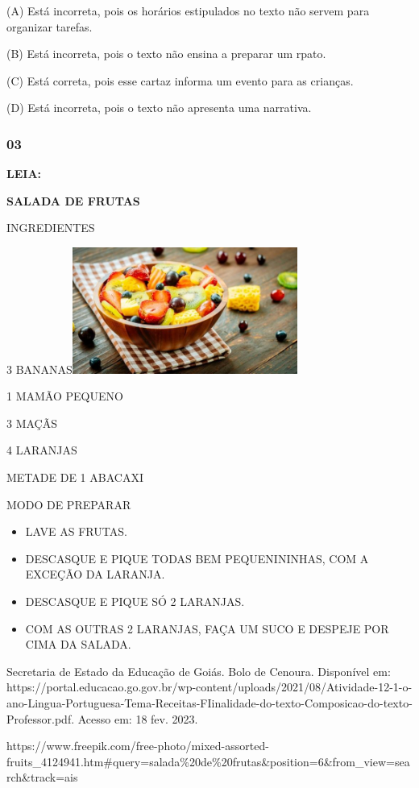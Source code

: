 (A) Está incorreta, pois os horários estipulados no texto não servem para organizar tarefas.

(B) Está incorreta, pois o texto não ensina a preparar um rpato.

(C) Está correta, pois esse cartaz informa um evento para as crianças.

(D) Está incorreta, pois o texto não apresenta uma narrativa.

\subsubsection{03 }\label{section-14}

\textbf{LEIA:}

\textbf{SALADA DE FRUTAS}

INGREDIENTES

3
BANANAS\includegraphics[width=2.90350in,height=1.63264in]{media/image159.jpg}

1 MAMÃO PEQUENO

3 MAÇÃS

4 LARANJAS

METADE DE 1 ABACAXI

MODO DE PREPARAR

\begin{itemize}
\item
  LAVE AS FRUTAS.
\item
  DESCASQUE E PIQUE TODAS BEM PEQUENININHAS, COM A EXCEÇÃO DA LARANJA.
\item
  DESCASQUE E PIQUE SÓ 2 LARANJAS.
\item
  COM AS OUTRAS 2 LARANJAS, FAÇA UM SUCO E DESPEJE POR CIMA DA SALADA.
\end{itemize}

Secretaria de Estado da Educação de Goiás. Bolo de Cenoura. Disponível
em: https://portal.educacao.go.gov.br/wp-content/uploads/2021/08/Atividade-12-1-o-ano-Lingua-Portuguesa-Tema-Receitas-FIinalidade-do-texto-Composicao-do-texto-Professor.pdf. Acesso em: 18 fev. 2023.

https://www.freepik.com/free-photo/mixed-assorted-fruits\_4124941.htm\#query=salada\%20de\%20frutas\&position=6\&from\_view=search\&track=ais

